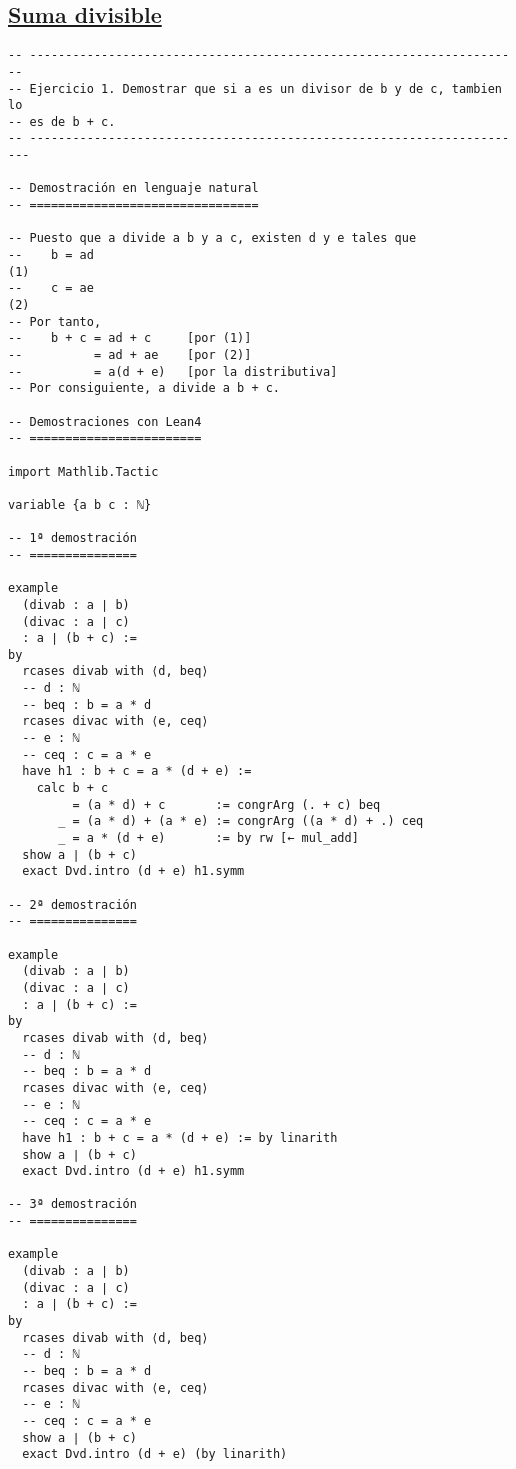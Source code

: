\subsection{\href{./src/Logica/Suma\_divisible.lean}{Suma divisible}}
\label{sec:orge20b8a1}
\begin{verbatim}
-- ---------------------------------------------------------------------
-- Ejercicio 1. Demostrar que si a es un divisor de b y de c, tambien lo
-- es de b + c.
-- ----------------------------------------------------------------------

-- Demostración en lenguaje natural
-- ================================

-- Puesto que a divide a b y a c, existen d y e tales que
--    b = ad                                                         (1)
--    c = ae                                                         (2)
-- Por tanto,
--    b + c = ad + c     [por (1)]
--          = ad + ae    [por (2)]
--          = a(d + e)   [por la distributiva]
-- Por consiguiente, a divide a b + c.

-- Demostraciones con Lean4
-- ========================

import Mathlib.Tactic

variable {a b c : ℕ}

-- 1ª demostración
-- ===============

example
  (divab : a ∣ b)
  (divac : a ∣ c)
  : a ∣ (b + c) :=
by
  rcases divab with ⟨d, beq⟩
  -- d : ℕ
  -- beq : b = a * d
  rcases divac with ⟨e, ceq⟩
  -- e : ℕ
  -- ceq : c = a * e
  have h1 : b + c = a * (d + e) :=
    calc b + c
         = (a * d) + c       := congrArg (. + c) beq
       _ = (a * d) + (a * e) := congrArg ((a * d) + .) ceq
       _ = a * (d + e)       := by rw [← mul_add]
  show a ∣ (b + c)
  exact Dvd.intro (d + e) h1.symm

-- 2ª demostración
-- ===============

example
  (divab : a ∣ b)
  (divac : a ∣ c)
  : a ∣ (b + c) :=
by
  rcases divab with ⟨d, beq⟩
  -- d : ℕ
  -- beq : b = a * d
  rcases divac with ⟨e, ceq⟩
  -- e : ℕ
  -- ceq : c = a * e
  have h1 : b + c = a * (d + e) := by linarith
  show a ∣ (b + c)
  exact Dvd.intro (d + e) h1.symm

-- 3ª demostración
-- ===============

example
  (divab : a ∣ b)
  (divac : a ∣ c)
  : a ∣ (b + c) :=
by
  rcases divab with ⟨d, beq⟩
  -- d : ℕ
  -- beq : b = a * d
  rcases divac with ⟨e, ceq⟩
  -- e : ℕ
  -- ceq : c = a * e
  show a ∣ (b + c)
  exact Dvd.intro (d + e) (by linarith)


\end{verbatim}
